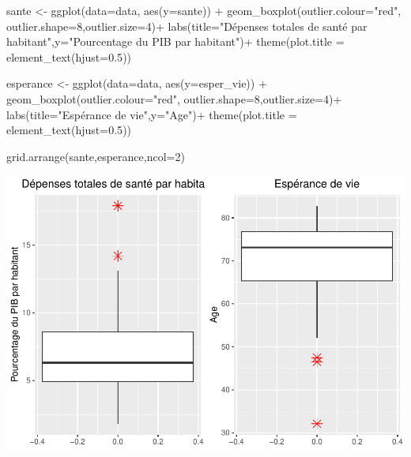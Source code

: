\documentclass[
]{article}
\newenvironment{Shaded}{\begin{snugshade}}{\end{snugshade}}
\newcommand{\AttributeTok}[1]{\textcolor[rgb]{0.77,0.63,0.00}{#1}}
\newcommand{\DecValTok}[1]{\textcolor[rgb]{0.00,0.00,0.81}{#1}}
\newcommand{\FloatTok}[1]{\textcolor[rgb]{0.00,0.00,0.81}{#1}}
\newcommand{\FunctionTok}[1]{\textcolor[rgb]{0.00,0.00,0.00}{#1}}
\newcommand{\NormalTok}[1]{#1}
\newcommand{\OtherTok}[1]{\textcolor[rgb]{0.56,0.35,0.01}{#1}}
\newcommand{\SpecialCharTok}[1]{\textcolor[rgb]{0.00,0.00,0.00}{#1}}
\newcommand{\StringTok}[1]{\textcolor[rgb]{0.31,0.60,0.02}{#1}}
\begin{document}
\begin{Shaded}
\begin{Highlighting}[]
\NormalTok{sante }\OtherTok{\textless{}{-}} \FunctionTok{ggplot}\NormalTok{(}\AttributeTok{data=}\NormalTok{data, }\FunctionTok{aes}\NormalTok{(}\AttributeTok{y=}\NormalTok{sante)) }\SpecialCharTok{+} 
  \FunctionTok{geom\_boxplot}\NormalTok{(}\AttributeTok{outlier.colour=}\StringTok{"red"}\NormalTok{, }\AttributeTok{outlier.shape=}\DecValTok{8}\NormalTok{,}\AttributeTok{outlier.size=}\DecValTok{4}\NormalTok{)}\SpecialCharTok{+}
  \FunctionTok{labs}\NormalTok{(}\AttributeTok{title=}\StringTok{"Dépenses totales de santé par habitant"}\NormalTok{,}\AttributeTok{y=}\StringTok{"Pourcentage du PIB par habitant"}\NormalTok{)}\SpecialCharTok{+}
  \FunctionTok{theme}\NormalTok{(}\AttributeTok{plot.title =} \FunctionTok{element\_text}\NormalTok{(}\AttributeTok{hjust=}\FloatTok{0.5}\NormalTok{))}

\NormalTok{esperance }\OtherTok{\textless{}{-}} \FunctionTok{ggplot}\NormalTok{(}\AttributeTok{data=}\NormalTok{data, }\FunctionTok{aes}\NormalTok{(}\AttributeTok{y=}\NormalTok{esper\_vie)) }\SpecialCharTok{+} 
  \FunctionTok{geom\_boxplot}\NormalTok{(}\AttributeTok{outlier.colour=}\StringTok{"red"}\NormalTok{, }\AttributeTok{outlier.shape=}\DecValTok{8}\NormalTok{,}\AttributeTok{outlier.size=}\DecValTok{4}\NormalTok{)}\SpecialCharTok{+}
  \FunctionTok{labs}\NormalTok{(}\AttributeTok{title=}\StringTok{"Espérance de vie"}\NormalTok{,}\AttributeTok{y=}\StringTok{"Age"}\NormalTok{)}\SpecialCharTok{+}
  \FunctionTok{theme}\NormalTok{(}\AttributeTok{plot.title =} \FunctionTok{element\_text}\NormalTok{(}\AttributeTok{hjust=}\FloatTok{0.5}\NormalTok{))}

\FunctionTok{grid.arrange}\NormalTok{(sante,esperance,}\AttributeTok{ncol=}\DecValTok{2}\NormalTok{)}
\end{Highlighting}
\end{Shaded}

\includegraphics{projet_apprentissage_non_supp_files/figure-latex/unnamed-chunk-6-1.pdf}
\end{document}
